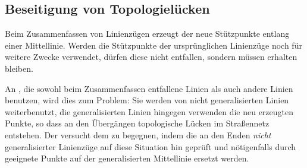 \documentclass[../main/thesis.tex]{subfiles}
\begin{document}
\subsection{Beseitigung von Topologielücken}
\label{ch:relocateGeneralisedNodes}

Beim Zusammenfassen von Linienzügen erzeugt der  neue Stützpunkte entlang einer Mittellinie.
Werden die Stützpunkte der ursprünglichen Linienzüge noch für weitere Zwecke verwendet, dürfen diese nicht entfallen, sondern müssen erhalten bleiben.


An , die sowohl beim Zusammenfassen entfallene Linien als auch andere Linien benutzen, wird dies zum Problem:
Sie werden von nicht generalisierten Linien weiterbenutzt, die generalisierten Linien hingegen verwenden die neu erzeugten Punkte, so dass an den Übergängen topologische Lücken im Straßennetz entstehen.
Der  versucht dem zu begegnen, indem die  an den Enden \emph{nicht} generalisierter Linienzüge auf diese Situation hin geprüft und nötigenfalls durch geeignete Punkte auf der generalisierten Mittellinie ersetzt werden.

\end{document}
